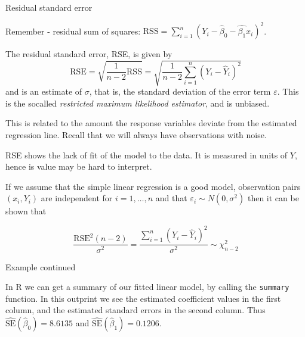 \documentclass[10pt,ignorenonframetext,]{beamer}
\begin{document}
\begin{frame}

\begin{block}{Residual standard error}

Remember - residual sum of squares:
\(\text{RSS}=\sum_{i=1}^n (Y_i-\hat{\beta}_0-\hat{\beta_1}x_{i})^2\).

The residual standard error, RSE, is given by
\[\text{RSE}  =\sqrt{\frac{1}{n-2} \text{RSS}} = \sqrt{\frac{1}{n-2}\sum_{i=1}^n (Y_i -\hat{Y}_i)^2}\]
and is an estimate of \(\sigma\), that is, the standard deviation of the
error term \(\varepsilon\). This is the socalled \emph{restricted
maximum likelihood estimator}, and is unbiased.

This is related to the amount the response variables deviate from the
estimated regression line. Recall that we will always have observations
with noise.

RSE shows the lack of fit of the model to the data. It is measured in
units of \(Y\), hence is value may be hard to interpret.

\end{block}

\end{frame}

\begin{frame}[fragile]

If we assume that the simple linear regression is a good model,
observation pairs \((x_i,Y_i)\) are independent for \(i=1,\ldots,n\) and
that \(\varepsilon_i\sim N(0,\sigma^2)\) then it can be shown that

\[\frac{\text{RSE}^2(n-2)}{\sigma^2}= \frac{\sum_{i=1}^n (Y_i -\hat{Y}_i)^2}{\sigma^2}\sim \chi^2_{n-2}\]

\begin{block}{Example continued}

In R we can get a summary of our fitted linear model, by calling the
\texttt{summary} function. In this outprint we see the estimated
coefficient values in the first column, and the estimated standard
errors in the second column. Thus
\(\hat{\text{SE}}(\hat{\beta}_0) = 8.6135\) and
\(\hat{\text{SE}}(\hat{\beta}_1) = 0.1206\).

\end{block}

\end{frame}
\end{document}
